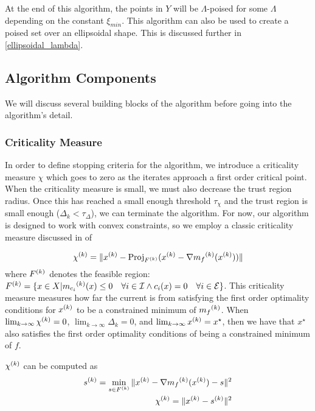At the end of this algorithm, the points in $Y$ will be $\Lambda$-poised for some $\Lambda$ depending on the constant $\xi_{min}$.
This algorithm can also be used to create a poised set over an ellipsoidal shape. This is discussed further in \cref{ellipsoidal_lambda}.



\subsection{Algorithm Components}




We will discuss several building blocks of the algorithm before going into the algorithm's detail.




\subsubsection{Criticality Measure}

In order to define stopping criteria for the algorithm, we introduce a criticality measure $\chi$ which goes to zero as the iterates approach a first order critical point.
When the criticality measure is small, we must also decrease the trust region radius.
Once this has reached a small enough threshold $\tau_{\chi}$ and the trust region is small enough ($\Delta_k < \tau_{\Delta}$), we can terminate the algorithm.
For now, our algorithm is designed to work with convex constraints, so we employ a classic criticality measure discussed in \cite{ConnGoulToin00} of

\[
{\chi^{(k)}} = \|{x^{(k)}} - \text{Proj}_{{F}^{(k)}}({x^{(k)}}- \nabla {{m}_f}^{(k)}({x^{(k)}}))\|
\]
where ${F}^{(k)}$ denotes the feasible region: ${F}^{(k)} = \{x \in X | {{m}_{c_i}}^{(k)}(x) \le 0 \quad \forall i \in \mathcal I \wedge c_i(x) = 0 \quad \forall i \in \mathcal E \}$.
This criticality measure measures how far the current is from satisfying the first order optimality conditions for ${x^{(k)}}$ to be a constrained minimum of ${{m}_f}^{(k)}$.
When $ \lim_{k\to\infty} {\chi^{(k)}} = 0$, $\lim_{k\to\infty}\Delta_k = 0$, and $\lim_{k\to\infty}{x^{(k)}} = x^{\star}$, then we have that $x^{\star}$ also satisfies the first order optimality conditions of being a constrained minimum of $f$.


${\chi^{(k)}}$ can be computed as 
\begin{align}
\label{critical}
{{s}^{(k)}} = \min_{s \in {F}^{(k)}} \|{x^{(k)}} - \nabla {{m}_f}^{(k)}({x^{(k)}}) - s\|^2 \\
{\chi^{(k)}} = \|{x^{(k)}} - {{s}^{(k)}} \|^2 \\
\end{align}

